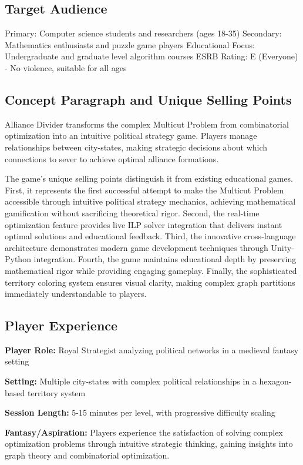 \documentclass[english]{tudscrreprt}
\begin{document}
\subsection{Target Audience}
Primary: Computer science students and researchers (ages 18-35)
Secondary: Mathematics enthusiasts and puzzle game players
Educational Focus: Undergraduate and graduate level algorithm courses
ESRB Rating: E (Everyone) - No violence, suitable for all ages

\subsection{Concept Paragraph and Unique Selling Points}
Alliance Divider transforms the complex Multicut Problem from combinatorial optimization into an intuitive political strategy game. Players manage relationships between city-states, making strategic decisions about which connections to sever to achieve optimal alliance formations.

The game's unique selling points distinguish it from existing educational games. First, it represents the first successful attempt to make the Multicut Problem accessible through intuitive political strategy mechanics, achieving mathematical gamification without sacrificing theoretical rigor. Second, the real-time optimization feature provides live ILP solver integration that delivers instant optimal solutions and educational feedback. Third, the innovative cross-language architecture demonstrates modern game development techniques through Unity-Python integration. Fourth, the game maintains educational depth by preserving mathematical rigor while providing engaging gameplay. Finally, the sophisticated territory coloring system ensures visual clarity, making complex graph partitions immediately understandable to players.

\subsection{Player Experience}
\textbf{Player Role:} Royal Strategist analyzing political networks in a medieval fantasy setting

\textbf{Setting:} Multiple city-states with complex political relationships in a hexagon-based territory system

\textbf{Session Length:} 5-15 minutes per level, with progressive difficulty scaling

\textbf{Fantasy/Aspiration:} Players experience the satisfaction of solving complex optimization problems through intuitive strategic thinking, gaining insights into graph theory and combinatorial optimization.
\end{document}
